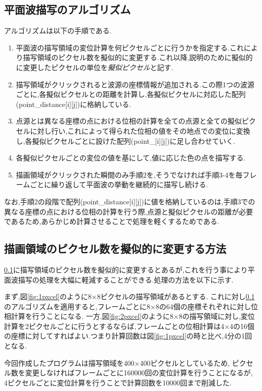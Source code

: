 \subsection{平面波描写のアルゴリズム} 
\label{sec:algo}
アルゴリズムは以下の手順である.
\begin{enumerate}
 \item 平面波の描写領域の変位計算を何ピクセルごとに行うかを指定する.これにより描写領域のピクセル数を擬似的に変更する.これ以降,説明のために擬似的に変更したピクセルの単位を\emph{擬似ピクセル}と記す.
  \item 描写領域がクリックされると波源の座標情報が追加される.この際1つの波源ごとに,各擬似ピクセルとの距離を計算し,各擬似ピクセルに対応した配列(point\_distance[i][j])に格納している.
  \item 点源とは異なる座標の点における位相の計算を全ての点源と全ての擬似ピクセルに対し行い,これによって得られた位相の値をその地点での変位に変換し,各擬似ピクセルごとに設けた配列(point\_[i][j])に足し合わせていく.
  \item 各擬似ピクセルごとの変位の値を基にして,値に応じた色の点を描写する.
 \item 描画領域がクリックされた瞬間のみ手順2を,そうでなければ手順3-4を毎フレームごとに繰り返して平面波の挙動を継続的に描写し続ける.
 \end{enumerate}
 なお,手順2の段階で配列(point\_distance[i][j])に値を格納しているのは,手順3での異なる座標の点における位相の計算を行う際,点源と擬似ピクセルの距離が必要であるため,あらかじめ計算させることで処理を軽くするためである.

\subsection{描画領域のピクセル数を擬似的に変更する方法}
\ref{sec:algo}に描写領域のピクセル数を擬似的に変更するとあるが,これを行う事により平面波描写の処理を大幅に軽減することができる.処理の方法を以下に示す.

まず,図\ref{fig:1pxcel}のように8×8ピクセルの描写領域があるとする.
これに対し\ref{sec:algo}のアルゴリズムを適用すると,フレームごとに8×8の64個の座標それぞれに対し位相計算を行うことになる.
一方,図\ref{fig:2pxcel}のように8×8の描写領域に対し,変位計算を2ピクセルごとに行うとするならば,フレームごとの位相計算は4×4の16個の座標に対してすればよい.つまり計算回数は図\ref{fig:1pxcel}の時と比べ,4分の1回となる.

今回作成したプログラムは描写領域を400×400ピクセルとしているため,
ピクセル数を変更しなければフレームごとに160000回の変位計算を行うことになるが,
4ピクセルごとに変位計算を行うことで計算回数を10000回まで削減した.

